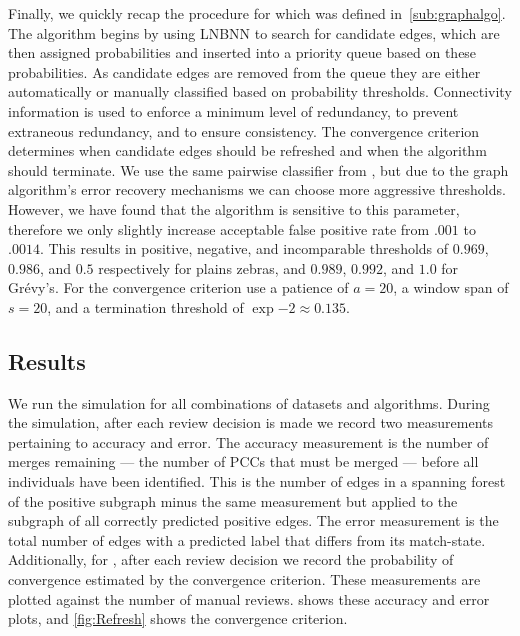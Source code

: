     Finally, we quickly recap the procedure for  which was defined in~\cref{sub:graphalgo}.
    The algorithm begins by using LNBNN to search for candidate edges, which are then assigned probabilities and
      inserted into a priority queue based on these probabilities.
    As candidate edges are removed from the queue they are either automatically or manually classified based on
      probability thresholds.
    Connectivity information is used to enforce a minimum level of redundancy, to prevent extraneous redundancy,
      and to ensure consistency.
    The convergence criterion determines when candidate edges should be refreshed and when the algorithm should
      terminate.
    We use the same pairwise classifier from , but due to the graph algorithm's error recovery
      mechanisms we can choose more aggressive thresholds.
    However, we have found that the algorithm is sensitive to this parameter, therefore we only slightly increase
      acceptable false positive rate from $.001$ to $.0014$.
    This results in positive, negative, and incomparable thresholds of $0.969$, $0.986$, and $0.5$ respectively
      for plains zebras, and $0.989$, $0.992$, and $1.0$ for Grévy's.
    For the convergence criterion use a patience of $a=20$, a window span of $s=20$, and a termination threshold
      of $\exp{-2}\approx0.135$.

    \subsection{Results}

    We run the simulation for all combinations of datasets and algorithms.
    During the simulation, after each review decision is made we record two measurements pertaining to accuracy
      and error.
    The accuracy measurement is the number of merges remaining --- \ie{} the number of PCCs that must be merged
      --- before all individuals have been identified.
    This is the number of edges in a spanning forest of the \groundtruth{} positive subgraph minus the same
      measurement but applied to the subgraph of all correctly predicted positive edges.
    The error measurement is the total number of edges with a predicted label that differs from its \groundtruth{}
      match-state.
    Additionally, for , after each review decision we record the probability of convergence estimated
      by the convergence criterion.
    These measurements are plotted against the number of manual reviews.
     shows these accuracy and error plots, and \cref{fig:Refresh} shows the convergence
      criterion.

